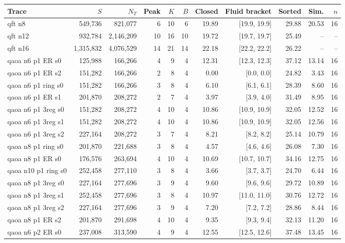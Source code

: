 \begin{table}[htbp]
\centering\scriptsize
\begin{tabular}{lrrrrrrrrrr}
\toprule
Trace & $S$ & $N_T$ & Peak & $K$ & $B$ & Closed & Fluid bracket & Sorted & Sim. & $n$\\\midrule
qft n8 & 549,736 & 821,077 & 6 & 10 & 6 & 19.89 & [19.9, 19.9] & 29.88 & 20.53 & 16\\
qft n12 & 932,784 & 2,146,209 & 10 & 16 & 10 & 19.72 & [19.7, 19.7] & 25.49 & -- & --\\
qft n16 & 1,315,832 & 4,076,529 & 14 & 21 & 14 & 22.18 & [22.2, 22.2] & 26.22 & -- & --\\
qaoa n6 p1 ER s0 & 125,988 & 166,266 & 4 & 9 & 4 & 12.31 & [12.3, 12.3] & 37.12 & 13.14 & 16\\
qaoa n6 p1 ER s2 & 151,282 & 166,266 & 2 & 8 & 4 & 0.00 & [0.0, 0.0] & 24.82 & 3.43 & 16\\
qaoa n6 p1 ring s0 & 151,282 & 166,266 & 3 & 8 & 4 & 6.10 & [6.1, 6.1] & 28.39 & 8.60 & 16\\
qaoa n6 p1 ER s1 & 201,870 & 208,272 & 2 & 7 & 4 & 3.97 & [3.9, 4.0] & 31.49 & 8.95 & 16\\
qaoa n6 p1 3reg s0 & 151,282 & 208,272 & 4 & 10 & 4 & 10.86 & [10.9, 10.9] & 32.05 & 12.52 & 16\\
qaoa n6 p1 3reg s1 & 151,282 & 208,272 & 4 & 10 & 4 & 10.86 & [10.9, 10.9] & 32.05 & 12.56 & 16\\
qaoa n6 p1 3reg s2 & 227,164 & 208,272 & 3 & 7 & 4 & 8.21 & [8.2, 8.2] & 25.14 & 10.79 & 16\\
qaoa n8 p1 ring s0 & 201,870 & 221,688 & 3 & 8 & 4 & 4.57 & [4.6, 4.6] & 26.08 & 7.30 & 16\\
qaoa n8 p1 ER s0 & 176,576 & 263,694 & 4 & 10 & 4 & 10.69 & [10.7, 10.7] & 34.16 & 12.75 & 16\\
qaoa n10 p1 ring s0 & 252,458 & 277,110 & 3 & 8 & 4 & 3.66 & [3.7, 3.7] & 24.70 & 6.44 & 16\\
qaoa n8 p1 3reg s0 & 227,164 & 277,696 & 3 & 9 & 4 & 9.60 & [9.6, 9.6] & 29.72 & 10.89 & 16\\
qaoa n8 p1 3reg s1 & 252,458 & 277,696 & 3 & 8 & 4 & 10.97 & [11.0, 11.0] & 30.76 & 12.72 & 16\\
qaoa n8 p1 3reg s2 & 227,164 & 277,696 & 3 & 9 & 4 & 7.20 & [7.2, 7.2] & 28.86 & 8.44 & 16\\
qaoa n8 p1 ER s2 & 201,870 & 291,698 & 4 & 10 & 4 & 9.35 & [9.3, 9.4] & 32.13 & 11.20 & 16\\
qaoa n6 p2 ER s0 & 237,008 & 313,590 & 4 & 9 & 4 & 12.55 & [12.5, 12.6] & 37.48 & 13.45 & 16\\

\end{tabular}
\end{table}
